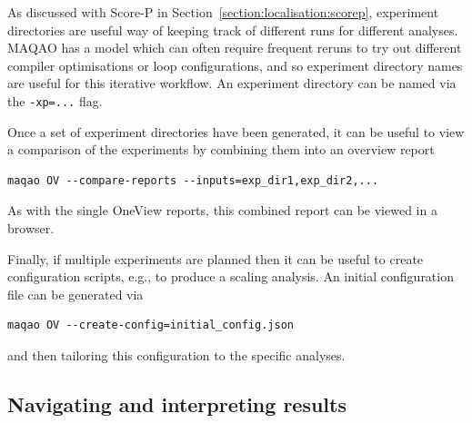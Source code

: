 As discussed with Score-P in Section~\ref{section:localisation:scorep},
experiment directories are useful way of keeping track of different runs for
different analyses. MAQAO has a model which can often require frequent reruns
to try out different compiler optimisations or loop configurations, and so
experiment directory names are useful for this iterative workflow. An
experiment directory can be named via the \texttt{-xp=...} flag.

Once a set of experiment directories have been generated, it can be useful to
view a comparison of the experiments by combining them into an overview report
\begin{verbatim}
maqao OV --compare-reports --inputs=exp_dir1,exp_dir2,...
\end{verbatim}
As with the single OneView reports, this combined report can be viewed in a
browser.

Finally, if multiple experiments are planned then it can be useful to create
configuration scripts, e.g., to produce a scaling analysis. An initial
configuration file can be generated via
\begin{verbatim}
maqao OV --create-config=initial_config.json
\end{verbatim}
and then tailoring this configuration to the specific analyses.

\subsection{Navigating and interpreting results}

